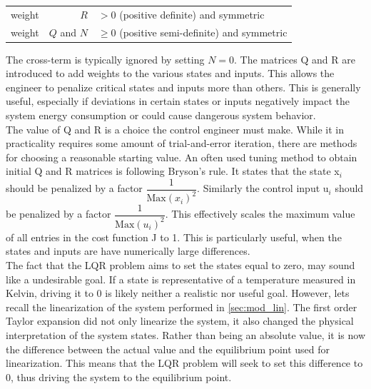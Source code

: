 \begin{center}
	\begin{tabular}{l r l }
		weight & $R$         & $ > 0$ (positive definite) and symmetric       \\
		weight & $Q$ and $N$ & $\ge 0$ (positive semi-definite) and symmetric
	\end{tabular}
\end{center}

The cross-term is typically ignored by setting $N=0$. The matrices Q and R are introduced to add weights to the various states and inputs. This allows the engineer to penalize critical states and inputs more than others. This is generally useful, especially if deviations in certain states or inputs negatively impact the system energy consumption or could cause dangerous system behavior.\\

The value of Q and R is a choice the control engineer must make. While it in practicality requires some amount of trial-and-error iteration, there are methods for choosing a reasonable starting value. An often used tuning method to obtain initial Q and R matrices is following Bryson's rule. It states that the state x$_{\textit{i}}$ should be penalized by a factor $\dfrac{1}{\text{Max} \left(x_{\textit{i}}\right)^2}$. Similarly the control input u$_{\textit{i}}$ should be penalized by a factor $\dfrac{1}{\text{Max} \left(u_{\textit{i}}\right)^2}$. This effectively scales the maximum value of all entries in the cost function J to 1. This is particularly useful, when the states and inputs are have numerically large differences.\\


The fact that the LQR problem aims to set the states equal to zero, may sound like a undesirable goal. If a state is representative of a temperature measured in Kelvin, driving it to 0 is likely neither a realistic nor useful goal. However, lets recall the linearization of the system performed in \cref{sec:mod_lin}. The first order Taylor expansion did not only linearize the system, it also changed the physical interpretation of the system states. Rather than being an absolute value, it is now the difference between the actual value and the equilibrium point used for linearization. This means that the LQR problem will seek to set this difference to 0, thus driving the system to the equilibrium point.\\

